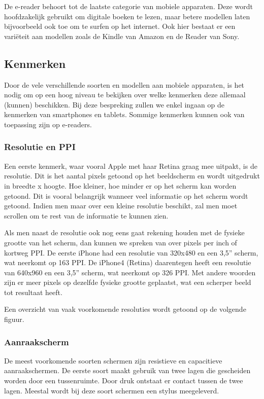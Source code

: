 De e-reader behoort tot de laatste categorie van mobiele apparaten. Deze wordt hoofdzakelijk gebruikt om digitale boeken te lezen, maar betere modellen laten bijvoorbeeld ook toe om te surfen op het internet. Ook hier bestaat er een variëteit aan modellen zoals de Kindle van Amazon en de Reader van Sony.

\subsection{Kenmerken}
Door de vele verschillende soorten en modellen aan mobiele apparaten, is het nodig om op een hoog niveau te bekijken over welke kenmerken deze allemaal (kunnen) beschikken. Bij deze bespreking zullen we enkel ingaan op de kenmerken van smartphones en tablets. Sommige kenmerken kunnen ook van toepassing zijn op e-readers.

\subsubsection{Resolutie en PPI}
Een eerste kenmerk, waar vooral Apple met haar Retina graag mee uitpakt, is de resolutie. Dit is het aantal pixels getoond op het beeldscherm en wordt uitgedrukt in breedte x hoogte. Hoe kleiner, hoe minder er op het scherm kan worden getoond. Dit is vooral belangrijk wanneer veel informatie op het scherm wordt getoond. Indien men maar over een kleine resolutie beschikt, zal men moet scrollen om te rest van de informatie te kunnen zien.

Als men naast de resolutie ook nog eens gaat rekening houden met de fysieke grootte van het scherm, dan kunnen we spreken van over pixels per inch of kortweg PPI. De eerste iPhone had een resolutie van 320x480 en een 3,5” scherm, wat neerkomt op 163 PPI. De iPhone4 (Retina) daarentegen heeft een resolutie van 640x960 en een 3,5” scherm, wat neerkomt op 326 PPI. Met andere woorden zijn er meer pixels op dezelfde fysieke grootte geplaatst, wat een scherper beeld tot resultaat heeft.

Een overzicht van vaak voorkomende resoluties wordt getoond op de volgende figuur.

\subsubsection{Aanraakscherm}
De meest voorkomende soorten schermen zijn resistieve en capacitieve aanraakschermen. De eerste soort maakt gebruik van twee lagen die gescheiden worden door een tussenruimte. Door druk ontstaat er contact tussen de twee lagen. Meestal wordt bij deze soort schermen een stylus meegeleverd. 

